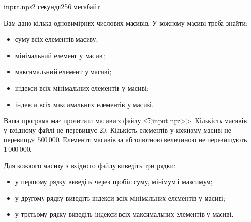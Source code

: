\begin{problem}{}{input.npz}{}{2 секунди}{256 мегабайт}

Вам дано кілька одновимірних числових масивів. У кожному масиві треба знайти:
\begin{itemize} 
\item суму всіх елементів масиву;
\item мінімальний елемент у масиві;
\item максимальний елемент у масиві;
\item індекси всіх мінімальних елементів у масиві;
\item індекси всіх максимальних елементів у масиві.
\end{itemize}

\InputFile
Ваша програма має прочитати масиви з файлу {\t {<<input.npz>>}}.
Кількість масивів у вхідному файлі не перевищує 20.
Кількість елементів у кожному масиві не перевищує $500\,000$.
Елементи масивів за абсолютною величиною не перевищують $1\,000\,000$.

\OutputFile
Для кожного масиву з вхідного файлу виведіть три рядки:
\begin{itemize} 
\item у першому рядку виведіть через пробіл суму, мінімум і максимум;
\item у другому рядку виведіть індекси всіх мінімальних елементів у масиві;
\item у третьому рядку виведіть індекси всіх максимальних елементів у масиві.
\end{itemize}


\Example
\begin{example}
%
\end{example}

\end{problem}

